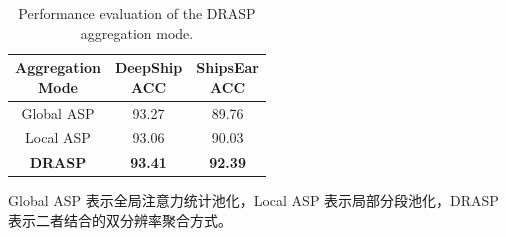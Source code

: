 \documentclass[a4paper, 12pt]{article}
\begin{document}
\begin{table}[htbp]
\centering
\caption{Performance evaluation of the DRASP aggregation mode.}
\label{tab:drasp_analysis}
\small
\setlength{\tabcolsep}{10pt}
\begin{tabular}{c|c|c}
\toprule
\makecell{Aggregation\\Mode} &
\makecell{DeepShip\\ACC} &
\makecell{ShipsEar\\ACC} \\
\midrule
Global ASP & 93.27 & 89.76 \\
Local ASP  & 93.06 & 90.03 \\
\rowcolor{gray!15}
\textbf{DRASP} & \textbf{93.41} & \textbf{92.39} \\
\bottomrule
\end{tabular}
\vspace{0.5ex}
\par\footnotesize Global ASP 表示全局注意力统计池化，Local ASP 表示局部分段池化，DRASP 表示二者结合的双分辨率聚合方式。
\end{table}





\end{document}
